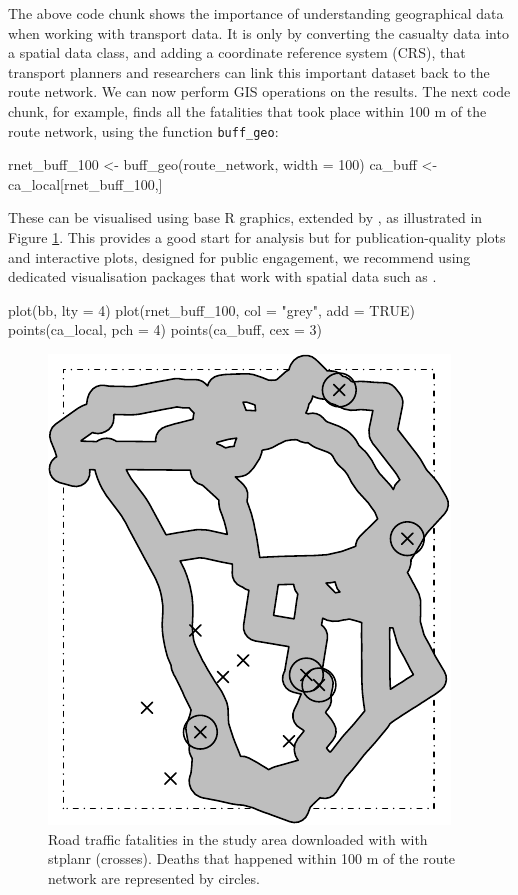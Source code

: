 The above code chunk shows the importance of understanding geographical
data when working with transport data. It is only by converting the
casualty data into a spatial data class, and adding a coordinate
reference system (CRS), that transport planners and researchers can link
this important dataset back to the route network. We can now perform GIS
operations on the results. The next code chunk, for example, finds all
the fatalities that took place within 100 m of the route network, using
the function \texttt{buff\_geo}:

\begin{Schunk}
\begin{Sinput}
rnet_buff_100 <- buff_geo(route_network, width = 100)
ca_buff <- ca_local[rnet_buff_100,]
\end{Sinput}
\end{Schunk}

These can be visualised using base R graphics, extended by ,
as illustrated in Figure \ref{fig:fats}. This provides a good start for
analysis but for publication-quality plots and interactive plots,
designed for public engagement, we recommend using dedicated
visualisation packages that work with spatial data such as
.

\begin{Schunk}
\begin{Sinput}
plot(bb, lty = 4)
plot(rnet_buff_100, col = "grey", add = TRUE)
points(ca_local, pch = 4)
points(ca_buff, cex = 3)
\end{Sinput}
\begin{figure}

{\centering \includegraphics[width=0.5\linewidth]{fats-1}

}

\caption[Road traffic fatalities in the study area downloaded with with stplanr (crosses)]{Road traffic fatalities in the study area downloaded with with stplanr (crosses). Deaths that happened within 100 m of the route network are represented by circles.}\label{fig:fats}
\end{figure}
\end{Schunk}

